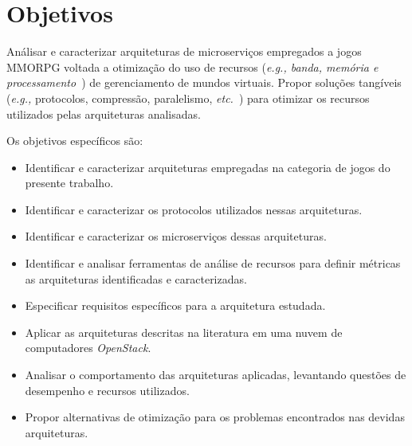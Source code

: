 \section{Objetivos}
\label{obj}

Análisar e caracterizar arquiteturas de microserviços empregados a jogos MMORPG voltada a otimização do uso de recursos (\textit{\textit{e.g.,} banda, memória e processamento}~\cite{1417630}) de gerenciamento de mundos virtuais.
%
Propor soluções tangíveis (\textit{e.g.,} protocolos, compressão, paralelismo, \textit{etc.}~\cite{1417630}) para otimizar os recursos utilizados pelas arquiteturas analisadas.

Os objetivos específicos são:
\begin{itemize}
    \item Identificar e caracterizar arquiteturas empregadas na categoria de jogos do presente trabalho.
    \item Identificar e caracterizar os protocolos utilizados nessas arquiteturas.
    \item Identificar e caracterizar os microserviços dessas arquiteturas.
    \item Identificar e analisar ferramentas de análise de recursos para definir métricas as arquiteturas identificadas e caracterizadas.
    \item Especificar requisitos específicos para a arquitetura estudada.
    \item Aplicar as arquiteturas descritas na literatura em uma nuvem de computadores \textit{OpenStack}.
    \item Analisar o comportamento das arquiteturas aplicadas, levantando questões de desempenho e recursos utilizados.
    \item Propor alternativas de otimização para os problemas encontrados nas devidas arquiteturas.
\end{itemize}
